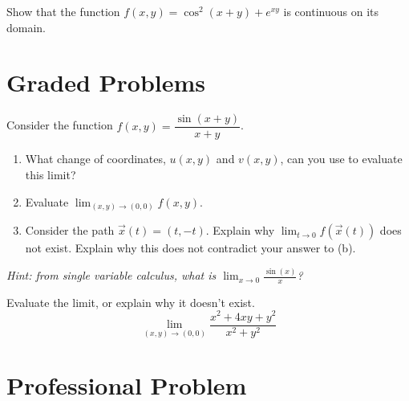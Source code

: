 \documentclass{ximera}
\begin{document}
\begin{problem}
Show that the function $f(x,y) = \cos^2(x+y) + e^{xy}$ is continuous on its domain.
\end{problem}

\section*{Graded Problems}

\begin{problem}
Consider the function $f(x,y) = \dfrac{\sin(x+y)}{x+y}$.
\begin{enumerate}
\item What change of coordinates, $u(x,y)$ and $v(x,y)$, can you use to evaluate this limit?
\item Evaluate $\lim_{(x,y)\rightarrow (0,0)}f(x,y)$.
\item Consider the path $\vec{x}(t) = (t,-t)$. Explain why $\lim_{t\rightarrow 0} f(\vec{x}(t))$ does not exist. Explain why this does not contradict your answer to (b).
\end{enumerate}
\emph{Hint: from single variable calculus, what is $\lim_{x\rightarrow 0}\frac{\sin(x)}{x}$?}
\end{problem}

\begin{problem}
Evaluate the limit, or explain why it doesn't exist.
\[
\lim_{(x,y)\rightarrow (0,0)}\frac{x^2+4xy+y^2}{x^2+y^2}
\]
\end{problem}

\section*{Professional Problem}
\end{document}
